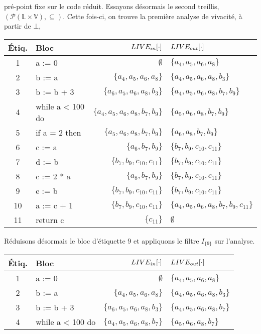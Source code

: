 \documentclass[a4paper, 10pt]{article}
\begin{document}
\begin{example}
pré-point fixe sur le code réduit. Essayons désormais le second treillis, 
$(\mathcal{P}(\mathbb{L} \times \mathbb{V}), \subseteq)$. Cette fois-ci, on trouve la première analyse de vivacité, à partir
de $\bot$,
\begin{center}
	\begin{tabular}{||c|l|r|l||}
	\hline
	Étiq. & Bloc & $LIVE_{in}[\cdot]$ & $LIVE_{out}[\cdot]$ \\
	\hline
	1 & a := 0 & $\emptyset$ & $\{a_4, a_5, a_6, a_8\}$\\
	2 & b := a & $\{a_4, a_5, a_6, a_8\}$ & $\{a_4, a_5, a_6, a_8, b_3\}$\\
	3 & b := b + 3 & $\{a_6, a_5, a_6, a_8, b_3\}$ & $\{a_4, a_5, a_6, a_8, b_7, b_9\}$\\
	4 & while a < 100 do & $\{a_4, a_5, a_6, a_8, b_7, b_9\}$ & $\{a_5, a_6, a_8, b_7, b_9\}$\\
	5 & if a = 2 then & $\{a_5, a_6, a_8, b_7, b_9\}$ & $\{a_6, a_8, b_7, b_9\}$\\
	6 & c := a & $\{a_6, b_7, b_9\}$ & $\{b_7, b_9, c_{10}, c_{11}\}$\\
	7 & d := b & $\{b_7, b_9, c_{10}, c_{11}\}$ & $\{b_7, b_9, c_{10}, c_{11}\}$\\
	8 & c := 2 * a & $\{a_8, b_7, b_9\}$ & $\{b_7, b_9, c_{10}, c_{11}\}$\\
	9 & e := b & $\{b_7, b_9, c_{10}, c_{11}\}$ & $\{b_7, b_9, c_{10}, c_{11}\}$\\
	10 & a := c + 1 & $\{b_7, b_9, c_{10}, c_{11}\}$ & $\{a_4, a_5, a_6, a_8, b_7, b_9, c_{11}\}$\\
	11 & return c & $\{c_{11}\}$ & $\emptyset$\\
	\hline
	\end{tabular}
\end{center}
Réduisons désormais le bloc d'étiquette 9 et appliquons le filtre $I_{\{9\}}$ sur l'analyse.
\begin{center}
	\begin{tabular}{||c|l|r|l||}
	\hline
	Étiq. & Bloc & $LIVE_{in}[\cdot]$ & $LIVE_{out}[\cdot]$ \\
	\hline
	1 & a := 0 & $\emptyset$ & $\{a_4, a_5, a_6, a_8\}$\\
	2 & b := a & $\{a_4, a_5, a_6, a_8\}$ & $\{a_4, a_5, a_6, a_8, b_3\}$\\
	3 & b := b + 3 & $\{a_6, a_5, a_6, a_8, b_3\}$ & $\{a_4, a_5, a_6, a_8, b_7\}$\\
	4 & while a < 100 do & $\{a_4, a_5, a_6, a_8, b_7\}$ & $\{a_5, a_6, a_8, b_7\}$\\

\end{tabular}
\end{center}
\end{example}
\end{document}
